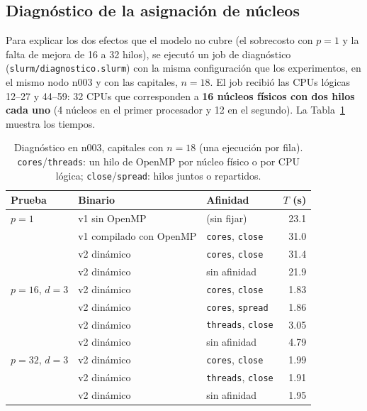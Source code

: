 \documentclass[12pt,a4paper]{article}
\begin{document}
\subsection{Diagnóstico de la asignación de núcleos}
\label{sec:diag}

Para explicar los dos efectos que el modelo no cubre (el sobrecosto con $p=1$ y la falta de mejora de 16 a 32 hilos), se ejecutó un job de diagnóstico (\texttt{slurm/diagnostico.slurm}) con la misma configuración que los experimentos, en el mismo nodo n003 y con las capitales, $n=18$. El job recibió las CPUs lógicas 12--27 y 44--59: 32 CPUs que corresponden a \textbf{16 núcleos físicos con dos hilos cada uno} (4 núcleos en el primer procesador y 12 en el segundo). La Tabla~\ref{tab:diag} muestra los tiempos.

\begin{table}[H]
\centering
\caption{Diagnóstico en n003, capitales con $n=18$ (una ejecución por fila). \texttt{cores}/\texttt{threads}: un hilo de OpenMP por núcleo físico o por CPU lógica; \texttt{close}/\texttt{spread}: hilos juntos o repartidos.}
\label{tab:diag}
\small
\begin{tabular}{lll r}
\toprule
Prueba & Binario & Afinidad & $T$ (s) \\
\midrule
$p=1$ & v1 sin OpenMP & (sin fijar) & 23.1 \\
 & v1 compilado con OpenMP & \texttt{cores}, \texttt{close} & 31.0 \\
 & v2 dinámico & \texttt{cores}, \texttt{close} & 31.4 \\
 & v2 dinámico & sin afinidad & 21.9 \\
\midrule
$p=16$, $d=3$ & v2 dinámico & \texttt{cores}, \texttt{close} & 1.83 \\
 & v2 dinámico & \texttt{cores}, \texttt{spread} & 1.86 \\
 & v2 dinámico & \texttt{threads}, \texttt{close} & 3.05 \\
 & v2 dinámico & sin afinidad & 4.79 \\
\midrule
$p=32$, $d=3$ & v2 dinámico & \texttt{cores}, \texttt{close} & 1.99 \\
 & v2 dinámico & \texttt{threads}, \texttt{close} & 1.91 \\
 & v2 dinámico & sin afinidad & 1.95 \\
\bottomrule
\end{tabular}
\end{table}
\end{document}
